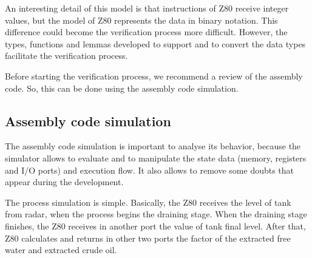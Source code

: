 An interesting detail of this model is  that instructions of Z80 receive integer
values, but the model of Z80 represents the data in binary notation. This
difference could become the verification process more difficult. However, the
types, functions and lemmas developed to support and to convert the data types
facilitate the verification process.

Before starting the verification process, we recommend a review of the assembly code. 
So, this can be done using the assembly code simulation.


\subsection{Assembly code simulation}


The assembly code simulation is important to analyse its behavior, because the
simulator allows to evaluate and to manipulate the state data (memory, registers and I/O ports) and execution flow.
It also allows to remove some doubts that appear during the development. 

The process simulation is simple. Basically, the Z80 receives the level of tank from radar, 
when the process begins the draining stage. When the draining stage finishes,
the Z80 receives in another port the value of tank final level. After that,
Z80 calculates and returns in other two ports the factor of the extracted free
water and extracted crude oil.





